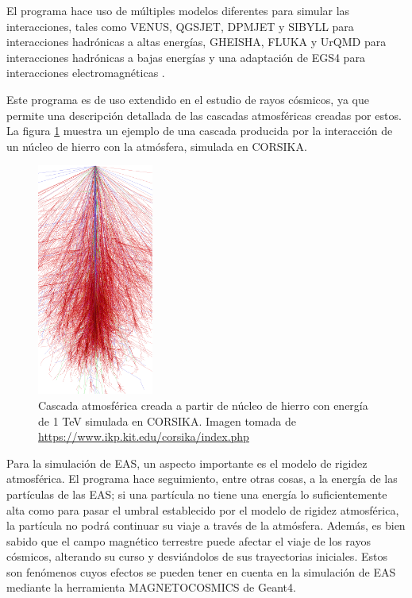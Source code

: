 \documentclass[12pt]{report}
\begin{document}
El programa hace uso de múltiples modelos diferentes para simular las interacciones, tales como VENUS, QGSJET, DPMJET y SIBYLL para interacciones hadrónicas a altas energías, GHEISHA, FLUKA y UrQMD para interacciones hadrónicas a bajas energías y una adaptación de EGS4 para interacciones electromagnéticas \cite{heck1998corsika}.

Este programa es de uso extendido en el estudio de rayos cósmicos, ya que permite una descripción detallada de las cascadas atmosféricas creadas por estos. La figura \ref{fig:ironcascade} muestra un ejemplo de una cascada producida por la interacción de un núcleo de hierro con la atmósfera, simulada en CORSIKA.

\begin{figure}
    \centering
    \includegraphics[width=1.5in]{images/ironcascade.png}
    \caption{Cascada atmosférica creada a partir de núcleo de hierro con energía de 1 TeV simulada en CORSIKA. Imagen tomada de \url{https://www.ikp.kit.edu/corsika/index.php}}
    \label{fig:ironcascade}
\end{figure}

Para la simulación de EAS, un aspecto importante es el modelo de rigidez atmosférica. El programa hace seguimiento, entre otras cosas, a la energía de las partículas de las EAS; si una partícula no tiene una energía lo suficientemente alta como para pasar el umbral establecido por el modelo de rigidez atmosférica, la partícula no podrá continuar su viaje a través de la atmósfera. Además, es bien sabido que el campo magnético terrestre puede afectar el viaje de los rayos cósmicos, alterando su curso y desviándolos de sus trayectorias iniciales. Estos son fenómenos cuyos efectos se pueden tener en cuenta en la simulación de EAS mediante la herramienta MAGNETOCOSMICS de Geant4.
\end{document}
